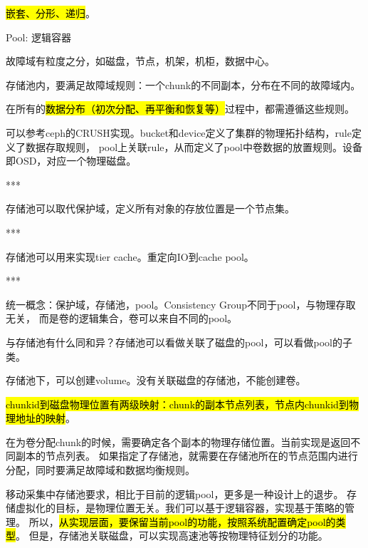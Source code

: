 \hl{嵌套、分形、递归}。


Pool: 逻辑容器

故障域有粒度之分，如磁盘，节点，机架，机柜，数据中心。

存储池内，要满足故障域规则：一个chunk的不同副本，分布在不同的故障域内。\label{rule:faultset}

在所有的\hl{数据分布（初次分配、再平衡和恢复等）}过程中，都需遵循这些规则。

\begin{tcolorbox}

可以参考ceph的CRUSH实现。bucket和device定义了集群的物理拓扑结构，rule定义了数据存取规则，
pool上关联rule，从而定义了pool中卷数据的放置规则。设备即OSD，对应一个物理磁盘。

***

存储池可以取代保护域，定义所有对象的存放位置是一个节点集。

***

存储池可以用来实现tier cache。重定向IO到cache pool。

***

统一概念：保护域，存储池，pool。Consistency Group不同于pool，与物理存取无关，
而是卷的逻辑集合，卷可以来自不同的pool。

\end{tcolorbox}

与存储池有什么同和异？存储池可以看做关联了磁盘的pool，可以看做pool的子类。


存储池下，可以创建volume。没有关联磁盘的存储池，不能创建卷。

\hl{chunkid到磁盘物理位置有两级映射：chunk的副本节点列表，节点内chunkid到物理地址的映射}。

在为卷分配chunk的时候，需要确定各个副本的物理存储位置。当前实现是返回不同副本的节点列表。
如果指定了存储池，就需要在存储池所在的节点范围内进行分配，同时要满足故障域和数据均衡规则。

\begin{tcolorbox}
移动采集中存储池要求，相比于目前的逻辑pool，更多是一种设计上的退步。
存储虚拟化的目标，是物理位置无关。我们可以基于逻辑容器，实现基于策略的管理。
所以，\hl{从实现层面，要保留当前pool的功能，按照系统配置确定pool的类型}。
但是，存储池关联磁盘，可以实现高速池等按物理特征划分的功能。
\end{tcolorbox}

